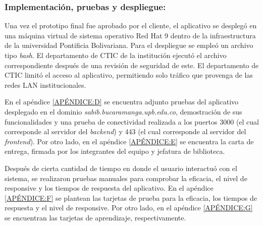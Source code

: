 \documentclass[spanish]{ieee_upb}
\begin{document}
\subsubsection[Implementación]{Implementación, pruebas y despliegue: }

Una vez el prototipo final fue aprobado por el cliente, el aplicativo se desplegó en una máquina virtual de sistema operativo Red Hat 9 dentro de la infraestructura de la universidad Pontificia Bolivariana.
Para el despliegue se empleó un archivo tipo \textit{bash}. El departamento de CTIC de la institución ejecutó el archivo correspondiente después de una revisión
de seguridad de este. El departamento de CTIC limitó el acceso al aplicativo, permitiendo solo tráfico que provenga de las redes LAN institucionales. 

\vspace{0.3cm}
En el apéndice \ref{APÉNDICE:D} se encuentra adjunto pruebas del aplicativo desplegado en el dominio \textit{sabib.bucaramanga.upb.edu.co}, demostración de sus funcionalidades y una prueba de conectividad realizada a los puertos 3000 (el cual corresponde al 
servidor del \textit{backend}) y 443 (el cual corresponde al servidor del \textit{frontend}). Por otro lado,
en el apéndice \ref{APÉNDICE:E} se encuentra la carta de entrega, firmada por los 
integrantes del equipo y jefatura de biblioteca.

\vspace{0.3cm}
Después de cierta cantidad de tiempo en donde el usuario interactuó con el sistema, se realizaron pruebas manuales para comprobar
la eficacia, el nivel de responsive y los tiempos de respuesta del aplicativo. En el apéndice \ref{APÉNDICE:F} se plantean 
las tarjetas de prueba para la eficacia, los tiempos de respuesta y el nivel de responsive. Por otro lado, en el apéndice \ref{APÉNDICE:G} se encuentran las tarjetas
de aprendizaje, respectivamente. 


\newpage
\end{document}
